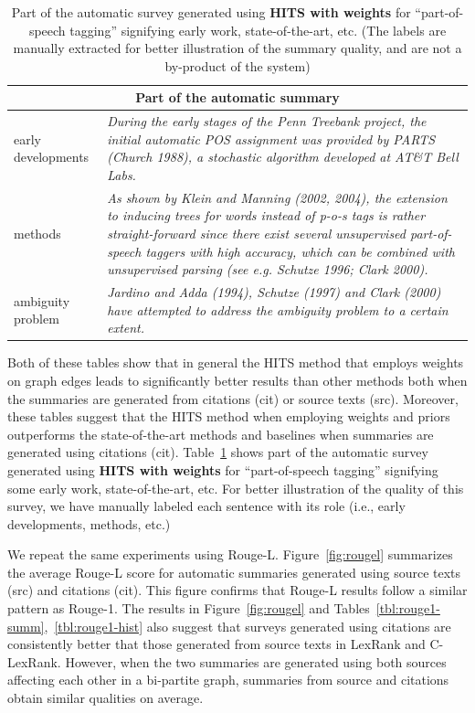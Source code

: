 \begin{table}
\centering
{\scriptsize
\begin{tabular}{p{1cm}p{6cm}} \hline
\multicolumn{2}{c}{{\bf Part of the automatic summary}}\\ \hline
early developments & {\it During the early stages of the Penn Treebank project, the initial automatic POS assignment was provided by PARTS (Church 1988), a stochastic algorithm developed at AT\&T Bell Labs.}\\ [1.5ex]
methods & {\it As shown by Klein and Manning (2002, 2004), the extension to inducing trees for words instead of p-o-s tags is rather straight-forward since there exist several unsupervised part-of-speech taggers with high accuracy, which can be combined with unsupervised parsing (see e.g. Schutze 1996; Clark 2000).}\\ [1.5ex]
ambiguity problem &  {\it Jardino and Adda (1994), Schutze (1997) and Clark (2000) have attempted to address the ambiguity problem to a certain extent.}\\ \hline
\end{tabular}}
\caption{Part of the automatic survey generated using {\bf HITS with weights} for ``part-of-speech tagging'' signifying early work, state-of-the-art, etc. (The labels are manually extracted for better illustration of the summary quality, and are not a by-product of the system)}\label{tbl:outeg}
\end{table}

Both of these tables show that in general the HITS method that employs weights on graph edges leads to significantly better results than other methods both when the summaries are generated from citations (cit) or source texts (src). Moreover, these tables suggest that the HITS method when employing weights and priors outperforms the state-of-the-art methods and baselines when summaries are generated using  citations (cit).
Table~\ref{tbl:outeg} shows part of the automatic survey generated using {\bf HITS with weights} for ``part-of-speech tagging'' signifying some early work, state-of-the-art, etc. For better illustration of the quality of this survey, we have manually labeled each sentence with its role (i.e., early developments, methods, etc.)

We repeat the same experiments using Rouge-L. Figure~\ref{fig:rougel} summarizes the average Rouge-L score for automatic summaries generated using source texts (src) and citations (cit). This figure confirms that Rouge-L results follow a similar pattern as Rouge-1. 
The results in Figure~\ref{fig:rougel} and Tables~\ref{tbl:rouge1-summ},~\ref{tbl:rouge1-hist} also suggest that surveys generated using citations are consistently better that those generated from source texts in LexRank and C-LexRank. However, when the two summaries are generated using both sources affecting each other in a bi-partite graph, summaries from source and citations obtain similar qualities on average.

